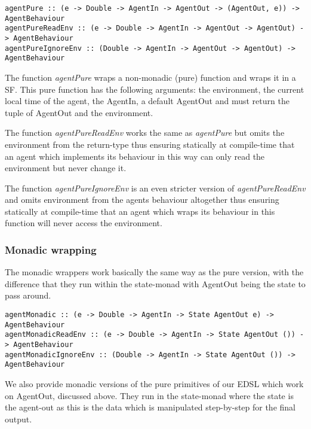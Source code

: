 \begin{verbatim}
agentPure :: (e -> Double -> AgentIn -> AgentOut -> (AgentOut, e)) -> AgentBehaviour
agentPureReadEnv :: (e -> Double -> AgentIn -> AgentOut -> AgentOut) -> AgentBehaviour
agentPureIgnoreEnv :: (Double -> AgentIn -> AgentOut -> AgentOut) -> AgentBehaviour
\end{verbatim}

The function \textit{agentPure} wraps a non-monadic (pure) function and wraps it in a SF. This pure function has the following arguments: the environment, the current local time of the agent, the AgentIn, a default AgentOut and must return the tuple of AgentOut and the environment.

The function \textit{agentPureReadEnv} works the same as \textit{agentPure} but omits the environment from the return-type thus ensuring statically at compile-time that an agent which implements its behaviour in this way can only read the environment but never change it.

The function \textit{agentPureIgnoreEnv} is an even stricter version of \textit{agentPureReadEnv} and omits environment from the agents behaviour altogether thus ensuring statically at compile-time that an agent which wraps its behaviour in this function will never access the environment.

\subsubsection{Monadic wrapping}
The monadic wrappers work basically the same way as the pure version, with the difference that they run within the state-monad with AgentOut being the state to pass around.

\begin{verbatim}
agentMonadic :: (e -> Double -> AgentIn -> State AgentOut e) -> AgentBehaviour
agentMonadicReadEnv :: (e -> Double -> AgentIn -> State AgentOut ()) -> AgentBehaviour
agentMonadicIgnoreEnv :: (Double -> AgentIn -> State AgentOut ()) -> AgentBehaviour
\end{verbatim}

We also provide monadic versions of the pure primitives of our EDSL which work on AgentOut, discussed above. They run in the state-monad where the state is the agent-out as this is the data which is manipulated step-by-step for the final output. 

